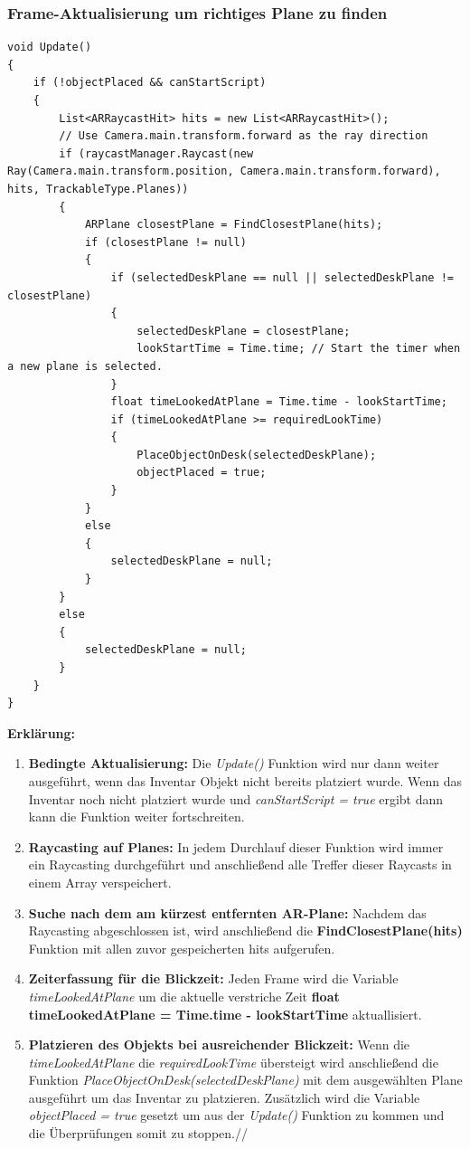\subsubsection{Frame-Aktualisierung um richtiges Plane zu finden}
\begin{lstlisting}[style=csharp, caption={}, label=code:Update]
void Update()
{
    if (!objectPlaced && canStartScript)
    {
        List<ARRaycastHit> hits = new List<ARRaycastHit>();
        // Use Camera.main.transform.forward as the ray direction
        if (raycastManager.Raycast(new Ray(Camera.main.transform.position, Camera.main.transform.forward), hits, TrackableType.Planes))
        {
            ARPlane closestPlane = FindClosestPlane(hits);
            if (closestPlane != null)
            {
                if (selectedDeskPlane == null || selectedDeskPlane != closestPlane)
                {
                    selectedDeskPlane = closestPlane;
                    lookStartTime = Time.time; // Start the timer when a new plane is selected.
                }
                float timeLookedAtPlane = Time.time - lookStartTime;
                if (timeLookedAtPlane >= requiredLookTime)
                {
                    PlaceObjectOnDesk(selectedDeskPlane);
                    objectPlaced = true;
                }
            }
            else
            {
                selectedDeskPlane = null;
            }
        }
        else
        {
            selectedDeskPlane = null;
        }
    }
}
\end{lstlisting}
\textbf{Erklärung:}
\begin{enumerate}
    \item \textbf{Bedingte Aktualisierung:} Die \textit{Update()} Funktion wird nur dann weiter ausgeführt, wenn das Inventar
    Objekt nicht bereits platziert wurde. Wenn das Inventar noch nicht platziert wurde und \textit{canStartScript = true}
    ergibt dann kann die Funktion weiter fortschreiten.
    \item \textbf{Raycasting auf Planes:} In jedem Durchlauf dieser Funktion wird immer ein Raycasting durchgeführt und
    anschließend alle Treffer dieser Raycasts in einem Array verspeichert.
    \item \textbf{Suche nach dem am kürzest entfernten AR-Plane:} Nachdem das Raycasting abgeschlossen ist, wird anschließend die
    \textbf{FindClosestPlane(hits)} Funktion mit allen zuvor gespeicherten hits aufgerufen.
    \item \textbf{Zeiterfassung für die Blickzeit:} Jeden Frame wird die Variable \textit{timeLookedAtPlane} um die aktuelle
    verstriche Zeit \textbf{float timeLookedAtPlane = Time.time - lookStartTime} aktuallisiert.
    \item \textbf{Platzieren des Objekts bei ausreichender Blickzeit:} Wenn die \textit{timeLookedAtPlane} die \textit{requiredLookTime}
    übersteigt wird anschließend die Funktion \textit{PlaceObjectOnDesk(selectedDeskPlane)} mit dem ausgewählten Plane
    ausgeführt um das Inventar zu platzieren. Zusätzlich wird die Variable \textit{objectPlaced = true} gesetzt um aus der \textit{Update()}
    Funktion zu kommen und die Überprüfungen somit zu stoppen.//
\end{enumerate}
